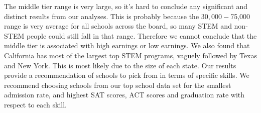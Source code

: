 \documentclass{article}
\begin{document}
\newline
\indent The middle tier range is very large, so it's hard to conclude any significant and distinct results from our analyses.  This is probably because the $30,000-$75,000 range is very average for all schools across the board, so many STEM and non-STEM people could still fall in that range.  Therefore we cannot conclude that the middle tier is associated with high earnings or low earnings.  
We also found that California has most of the largest top STEM programs, vaguely followed by Texas and New York.  This is most likely due to the size of each state.  
\newline
\indent Our results provide a recommendation of schools to pick from in terms of specific skills.  We recommend choosing schools from our top school data set for the smallest admission rate, and highest SAT scores, ACT scores and graduation rate with respect to each skill.  
\end{document}
